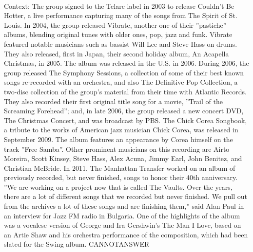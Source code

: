 \documentclass[11pt,a4paper, onecolumn]{article}
\begin{document}
\\ Context: The group signed to the Telarc label in 2003 to release Couldn't Be Hotter, a live performance capturing many of the songs from The Spirit of St. Louis. In 2004, the group released Vibrate, another one of their ''pastiche'' albums, blending original tunes with older ones, pop, jazz and funk. Vibrate featured notable musicians such as bassist Will Lee and Steve Hass on drums. They also released, first in Japan, their second holiday album, An Acapella Christmas, in 2005. The album was released in the U.S. in 2006. During 2006, the group released The Symphony Sessions, a collection of some of their best known songs re-recorded with an orchestra, and also The Definitive Pop Collection, a two-disc collection of the group's material from their time with Atlantic Records. They also recorded their first original title song for a movie, ''Trail of the Screaming Forehead''; and, in late 2006, the group released a new concert DVD, The Christmas Concert, and was broadcast by PBS. The Chick Corea Songbook, a tribute to the works of American jazz musician Chick Corea, was released in September 2009. The album features an appearance by Corea himself on the track ''Free Samba''. Other prominent musicians on this recording are Airto Moreira, Scott Kinsey, Steve Hass, Alex Acuna, Jimmy Earl, John Benitez, and Christian McBride. In 2011, The Manhattan Transfer worked on an album of previously recorded, but never finished, songs to honor their 40th anniversary. ''We are working on a project now that is called The Vaults. Over the years, there are a lot of different songs that we recorded but never finished. We pull out from the archives a lot of these songs and are finishing them,'' said Alan Paul in an interview for Jazz FM radio in Bulgaria. One of the highlights of the album was a vocalese version of George and Ira Gershwin's The Man I Love, based on an Artie Shaw and his orchestra performance of the composition, which had been slated for the Swing album. CANNOTANSWER
\end{document}
